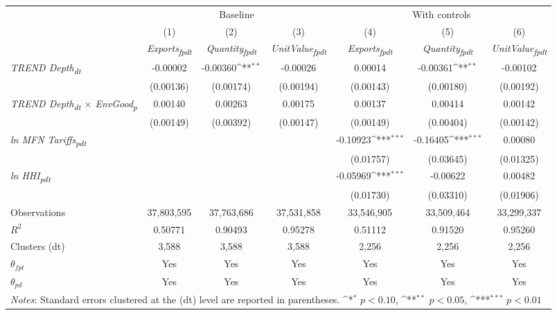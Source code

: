 {
\def\sym#1{\ifmmode^{#1}\else\(^{#1}\)\fi}
\begin{tabular}{l*{6}{c}}
\toprule
&\multicolumn{3}{c}{Baseline}&\multicolumn{3}{c}{With controls}\\\cmidrule(lr){2-4}\cmidrule(lr){5-7}
&(1)&(2)&(3)&(4)&(5)&(6)\\
&\textit{Exports\textsubscript{fpdt}}&\textit{Quantity\textsubscript{fpdt}}&\textit{UnitValue\textsubscript{fpdt}}&\textit{Exports\textsubscript{fpdt}}&\textit{Quantity\textsubscript{fpdt}}&\textit{UnitValue\textsubscript{fpdt}}\\
\midrule
\textit{TREND Depth\textsubscript{dt}} & -0.00002 & -0.00360\sym{**} & -0.00026 & 0.00014 & -0.00361\sym{**} & -0.00102\\
 & (0.00136) & (0.00174) & (0.00194) & (0.00143) & (0.00180) & (0.00192)\\
\addlinespace
\textit{TREND Depth\textsubscript{dt} $\times$ EnvGood\textsubscript{p}} & 0.00140 & 0.00263 & 0.00175 & 0.00137 & 0.00414 & 0.00142\\
 & (0.00149) & (0.00392) & (0.00147) & (0.00149) & (0.00404) & (0.00142)\\
\addlinespace
\textit{ln MFN Tariffs\textsubscript{pdt}} &  &  &  & -0.10923\sym{***} & -0.16405\sym{***} & 0.00080\\
 &  &  &  & (0.01757) & (0.03645) & (0.01325)\\
\addlinespace
\textit{ln HHI\textsubscript{pdt}} &  &  &  & -0.05969\sym{***} & -0.00622 & 0.00482\\
 &  &  &  & (0.01730) & (0.03310) & (0.01906)\\
\midrule
Observations & 37,803,595 & 37,763,686 & 37,531,858 & 33,546,905 & 33,509,464 & 33,299,337\\
$R^{2}$ & 0.50771 & 0.90493 & 0.95278 & 0.51112 & 0.91520 & 0.95260\\
Clusters (dt) & 3,588 & 3,588 & 3,588 & 2,256 & 2,256 & 2,256\\
$\theta_{fpt}$ & Yes & Yes & Yes & Yes & Yes & Yes\\
$\theta_{pd}$ & Yes & Yes & Yes & Yes & Yes & Yes\\
\bottomrule
\multicolumn{7}{l}{\footnotesize \textit{Notes}: Standard errors clustered at the (dt) level are reported in parentheses. \sym{*} \(p<0.10\), \sym{**} \(p<0.05\), \sym{***} \(p<0.01\)}\\
\end{tabular}
}
